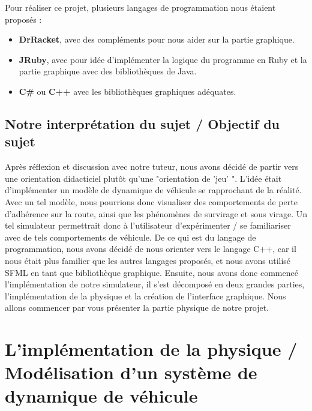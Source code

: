 \documentclass[a4paper,12pt]{report}
\begin{document}
Pour réaliser ce projet, plusieurs langages de programmation nous étaient proposés :
\begin{itemize}
    \item \textbf{DrRacket}, avec des compléments pour nous aider sur la partie graphique.
    \item \textbf{JRuby}, avec pour idée d'implémenter la logique du programme en Ruby et la partie graphique avec des bibliothèques de Java.
    \item \textbf{C\#} ou \textbf{C++} avec les bibliothèques graphiques adéquates.
\end{itemize}


\subsection{Notre interprétation du sujet / Objectif du sujet }
Après réflexion et discussion avec notre tuteur, nous avons décidé de partir vers une orientation didacticiel plutôt qu'une "orientation de 'jeu' ". L'idée était d'implémenter un modèle de dynamique de véhicule se rapprochant de la réalité. Avec un tel modèle, nous pourrions donc visualiser des comportements de perte d'adhérence sur la route, ainsi que les phénomènes de survirage et sous virage. Un tel simulateur permettrait donc à l'utilisateur d'expérimenter / se familiariser avec de tels comportements de véhicule. De ce qui est du langage de programmation, nous avons décidé de nous orienter vers le langage C++, car il nous était plus familier que les autres langages proposés, et nous avons utilisé SFML en tant que bibliothèque graphique.
Ensuite, nous avons donc commencé l'implémentation de notre simulateur, il s'est décomposé en deux grandes parties, l'implémentation de la physique et la création de l'interface graphique. Nous allons commencer par vous présenter la partie physique de notre projet.

\newpage

\section{L'implémentation de la physique / Modélisation d'un système de dynamique de véhicule}
\end{document}

